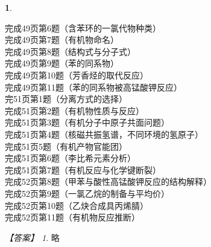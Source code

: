 \documentclass[UTF8, 10pt, a4paper, oneside]{ctexart}
\newcommand{\fs}[1]{{\fangsong #1}}%
\theoremstyle{definition}
\newtheorem{exercise}{}
\theoremstyle{remark}
\newtheorem*{answer}{【答案】}
\theoremstyle{plain}
\begin{document}
\begin{exercise}
    \begin{multicols}{2}
        \noindent 完成49页第6题（含苯环的一氯代物种类）\\
        完成49页第7题（有机物命名）\\
        完成49页第8题（结构式与分子式）\\
        完成49页第9题（苯的同系物）\\
        完成49页第10题（芳香烃的取代反应）\\
        完成49页第11题（苯的同系物被高锰酸钾反应）\\
        完51页第1题（分离方式的选择）\\
        完成51页第2题（有机物性质与反应）\\
        完成51页第3题（有机分子中原子共面问题）\\
        完成51页第4题（核磁共振氢谱，不同环境的氢原子）\\
        完成51页5题（有机产物官能团）\\
        完成51页第6题（李比希元素分析）\\
        完成51页第7题（有机反应与化学键断裂）\\
        完成52页第8题（甲苯与酸性高锰酸钾反应的结构解释）\\
        完成52页第9题（一氯乙烷的制备与平均价）\\
        完成52页第10题（乙炔合成具丙烯腈）\\
        完成52页第11题（有机物反应推断）\\
    \end{multicols}
    \begin{answer}
        \fs{略}
    \end{answer}
\end{exercise}
\end{document}
